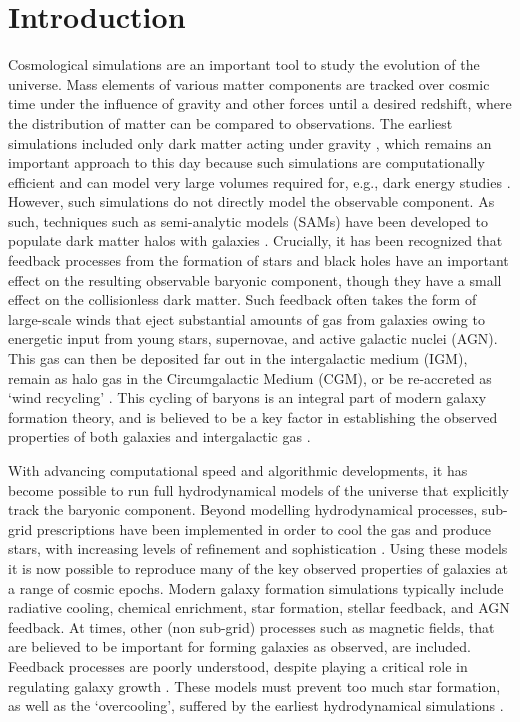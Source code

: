 \section{Introduction}
\label{sec:introduction}

Cosmological simulations are an important tool to study the evolution of the
universe. Mass elements of various matter components are tracked over cosmic
time under the influence of gravity and other forces until a desired
redshift, where the distribution of matter can be compared to observations.
The earliest simulations included only dark matter acting under gravity
\citep[see e.g.][]{Frenk1988, Springel2005a}, which remains an important
approach to this day because such simulations are computationally efficient
and can model very large volumes required for, e.g., dark energy studies
\citep{Knabenhans2019}. However, such simulations do not directly model the
observable component. As such, techniques such as semi-analytic models (SAMs)
have been developed \citep{FrenkWhite1990,Kauffmann1996,Somerville1998} to
populate dark matter halos with galaxies \citep[see e.g.][for modern examples
of SAM frameworks]{Porter2014, Henriques2015, Lacey2016}. Crucially, it has
been recognized that feedback processes from the formation of stars and black
holes have an important effect on the resulting observable baryonic
component, though they have a small effect on the collisionless dark matter.
Such feedback often takes the form of large-scale winds that eject
substantial amounts of gas from galaxies owing to energetic input from young
stars, supernovae, and active galactic nuclei (AGN). This gas can then be
deposited far out in the intergalactic medium (IGM), remain as halo gas in
the Circumgalactic Medium (CGM), or be re-accreted as `wind
recycling' \citep{Oppenheimer2010}. This cycling of baryons is an integral
part of modern galaxy formation theory, and is believed to be a key factor in
establishing the observed properties of both galaxies and intergalactic
gas \citep{Somerville2015}.

With advancing computational speed and algorithmic developments, it has
become possible to run full hydrodynamical models of the universe that
explicitly track the baryonic component. %
Beyond modelling hydrodynamical processes,
sub-grid prescriptions have been implemented in order to cool the gas and
produce stars, with increasing levels of refinement and sophistication
\citep[e.g.][]{Revaz2012, Vogelsberger2014, Schaye2015}. Using these models
it is now possible to reproduce many of the key observed properties of
galaxies at a range of cosmic epochs. Modern galaxy formation simulations
typically include radiative cooling, chemical enrichment, star formation,
stellar feedback, and AGN feedback. At times, other (non sub-grid) processes
such as magnetic fields, that are believed to be important for forming
galaxies as observed, are included. Feedback processes are poorly understood,
despite playing a critical role in regulating galaxy growth \citep{Naab2017}.
These models must prevent too much star formation, as well as the `overcooling',
suffered by the earliest hydrodynamical simulations
\citep{Dave2001,Balogh2001}.

